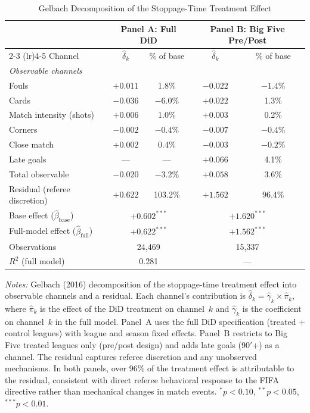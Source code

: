 \begin{table}[htbp]
\centering
\begin{threeparttable}
\caption{Gelbach Decomposition of the Stoppage-Time Treatment Effect}
\label{tab:mechanism}
\begin{tabular}{lcccc}
\toprule
& \multicolumn{2}{c}{Panel A: Full DiD} & \multicolumn{2}{c}{Panel B: Big Five Pre/Post} \\
\cmidrule(lr){2-3} \cmidrule(lr){4-5}
Channel & $\hat{\delta}_k$ & \% of base & $\hat{\delta}_k$ & \% of base \\
\midrule
\multicolumn{5}{l}{\textit{Observable channels}} \\[3pt]
Fouls          & $+0.011$  & 1.8\%   & $-0.022$ & $-1.4$\% \\
Cards          & $-0.036$  & $-6.0$\% & $+0.022$ & 1.3\%   \\
Match intensity (shots) & $+0.006$  & 1.0\%   & $+0.003$ & 0.2\%   \\
Corners        & $-0.002$  & $-0.4$\% & $-0.007$ & $-0.4$\% \\
Close match    & $+0.002$  & 0.4\%   & $-0.003$ & $-0.2$\% \\
Late goals     & ---       & ---     & $+0.066$ & 4.1\%   \\[3pt]
\midrule
Total observable  & $-0.020$ & $-3.2$\% & $+0.058$ & 3.6\% \\
Residual (referee discretion) & $+0.622$ & 103.2\% & $+1.562$ & 96.4\% \\[3pt]
\midrule
Base effect ($\hat{\beta}_{\text{base}}$) & \multicolumn{2}{c}{$+0.602^{***}$} & \multicolumn{2}{c}{$+1.620^{***}$} \\
Full-model effect ($\hat{\beta}_{\text{full}}$) & \multicolumn{2}{c}{$+0.622^{***}$} & \multicolumn{2}{c}{$+1.562^{***}$} \\
Observations & \multicolumn{2}{c}{24,469} & \multicolumn{2}{c}{15,337} \\
$R^2$ (full model) & \multicolumn{2}{c}{0.281} & \multicolumn{2}{c}{---} \\
\bottomrule
\end{tabular}
\begin{tablenotes}[flushleft]
\footnotesize
\item \textit{Notes:} Gelbach (2016) decomposition of the stoppage-time treatment effect
into observable channels and a residual. Each channel's contribution is
$\hat{\delta}_k = \hat{\gamma}_k \times \hat{\pi}_k$, where $\hat{\pi}_k$ is the
effect of the DiD treatment on channel~$k$ and $\hat{\gamma}_k$ is the coefficient on
channel~$k$ in the full model. Panel~A uses the full DiD specification (treated + control
leagues) with league and season fixed effects. Panel~B restricts to Big Five treated leagues
only (pre/post design) and adds late goals (90$'$+) as a channel. The residual captures
referee discretion and any unobserved mechanisms. In both panels, over 96\% of the
treatment effect is attributable to the residual, consistent with direct referee
behavioral response to the FIFA directive rather than mechanical changes in match events.
$^{*}p<0.10$, $^{**}p<0.05$, $^{***}p<0.01$.
\end{tablenotes}
\end{threeparttable}
\end{table}
